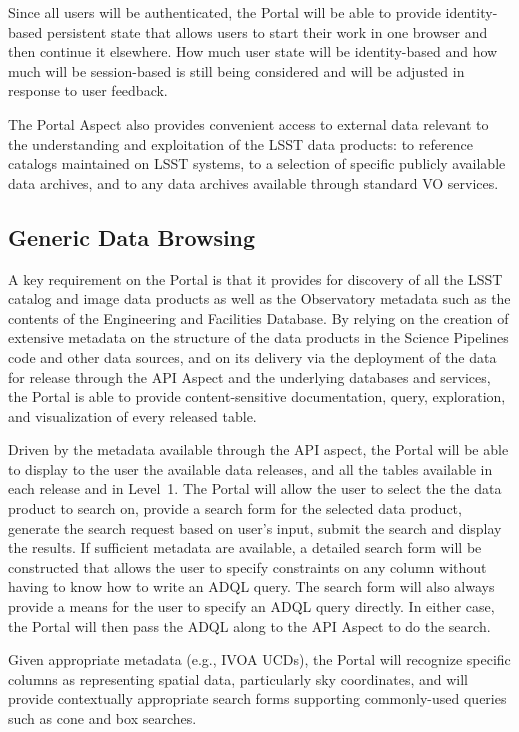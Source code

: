 Since all users will be authenticated, the Portal will be able to provide identity-based persistent state that allows users to start their work in one browser and then continue it elsewhere.
How much user state will be identity-based and how much will be session-based is still being considered and will be adjusted in response to user feedback.

The Portal Aspect also provides convenient access to external data relevant to the understanding and exploitation of the LSST data products:
to reference catalogs maintained on LSST systems,
to a selection of specific publicly available data archives,
and to any data archives available through standard VO services.

\subsection{Generic Data Browsing}\label{generic-data-browsing}

A key requirement on the Portal is that it provides for discovery of all the LSST catalog and image data products as well as the Observatory metadata such as the contents of the Engineering and Facilities Database.
By relying on the creation of extensive metadata on the structure of the data products in the Science Pipelines code and other data sources, and on its delivery via the deployment of the data for release through the API Aspect and the underlying databases and services, the Portal is able to provide content-sensitive documentation, query, exploration, and visualization of every released table.

Driven by the metadata available through the API aspect, the Portal will be able to display to the user the available data releases, and all the tables available in each release and in Level~1.
The Portal will allow the user to select the the data product to search on, provide a search form for the selected data product, generate the search request based on user's input, submit the search and display the results.
If sufficient metadata are available, a detailed search form will be constructed that allows the user to specify constraints on any column without having to know how to write an ADQL query.
The search form will also always provide a means for the user to specify an ADQL query directly.
In either case, the Portal will then pass the ADQL along to the API Aspect to do the search.

Given appropriate metadata (e.g., IVOA UCDs), the Portal will recognize specific columns as representing spatial data, particularly sky coordinates, and will provide contextually appropriate search forms supporting commonly-used queries such as cone and box searches.

